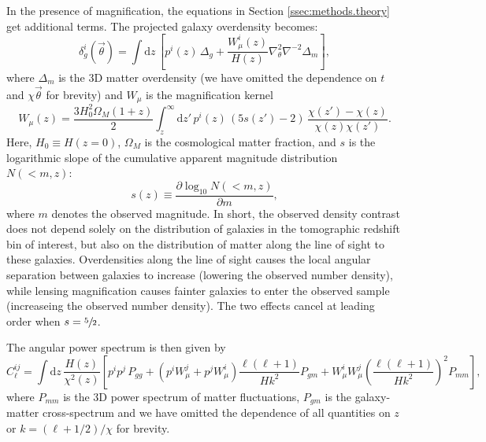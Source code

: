 \documentclass[a4paper,11pt]{article}
\newcommand{\nv}{\vec{\theta}}
\begin{document}
    In the presence of magnification, the equations in Section \ref{ssec:methods.theory} get additional terms. The projected galaxy overdensity becomes:
    \begin{equation}
      \delta^i_g(\nv)=\int \mathrm{d}z\,\left[p^i(z)\,\Delta_g+\frac{W_\mu^i(z)}{H(z)}\nabla_\theta^2\nabla^{-2}\Delta_m\right],
    \end{equation}
    where $\Delta_m$ is the 3D matter overdensity (we have omitted the dependence on $t$ and $\chi\nv$ for brevity) and $W_\mu$ is the magnification kernel
    \begin{equation}
      W_\mu(z)=\frac{3H_0^2\Omega_M(1+z)}{2}\int_z^\infty \mathrm{d}z'\,p^i(z)\,\left(5s(z')-2\right)\,\frac{\chi(z')-\chi(z)}{\chi(z)\chi(z')}.
    \end{equation}
    Here, $H_0\equiv H(z=0)$, $\Omega_M$ is the cosmological matter fraction, and $s$ is the logarithmic slope of the cumulative apparent magnitude distribution $N(<m, z)$:
    \begin{equation}
      s(z) \equiv \frac{\partial \log_{10}N(<m, z)}{\partial m},
      \label{eq:s-func}
    \end{equation}
    where $m$ denotes the observed magnitude. In short, the observed density contrast does not depend solely on the distribution of galaxies in the tomographic redshift bin of interest, but also on the distribution of matter along the line of sight to these galaxies. Overdensities along the line of sight causes the local angular separation between galaxies to increase (lowering the observed number density), while lensing magnification causes fainter galaxies to enter the observed sample (increaseing the observed number density). The two effects cancel at leading order when $s=\sfrac{5}{2}$. 

    The angular power spectrum is then given by
    \begin{equation}\label{eq:cell_gg_wmag}
      C^{ij}_\ell = \int \mathrm{d}z\,\frac{H(z)}{\chi^2(z)}\left[p^ip^j\,P_{gg}+\left(p^iW_\mu^j+p^jW_\mu^i\right)\frac{\ell(\ell+1)}{Hk^2}P_{gm}+W_\mu^iW_\mu^j\left(\frac{\ell(\ell+1)}{Hk^2}\right)^2P_{mm}\right],
    \end{equation}
    where $P_{mm}$ is the 3D power spectrum of matter fluctuations, $P_{gm}$ is the galaxy-matter cross-spectrum and we have omitted the dependence of all quantities on $z$ or $k=(\ell+1/2)/\chi$ for brevity.
\end{document}
